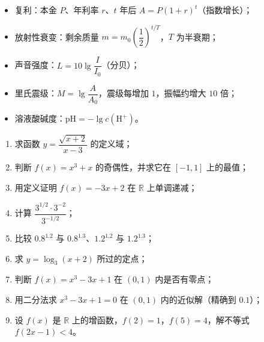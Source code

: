\begin{explore}
\begin{itemize}
  \item 复利：本金 $P$、年利率 $r$、$t$ 年后 $A=P(1+r)^t$（指数增长）；
  \item 放射性衰变：剩余质量 $m=m_0\left(\dfrac12\right)^{t/T}$，$T$ 为半衰期；
  \item 声音强度：$L=10\lg\dfrac{I}{I_0}$（分贝）；
  \item 里氏震级：$M=\lg\dfrac{A}{A_0}$，震级每增加 $1$，振幅约增大 $10$ 倍；
  \item 溶液酸碱度：$\mathrm{pH}=-\lg c(\mathrm{H}^+)$。
\end{itemize}

\end{explore}

\begin{inclasstest}
\begin{enumerate}
  \item 求函数 $y=\dfrac{\sqrt{x+2}}{x-3}$ 的定义域；
  \item 判断 $f(x)=x^3+x$ 的奇偶性，并求它在 $[-1,1]$ 上的最值；
  \item 用定义证明 $f(x)=-3x+2$ 在 $\mathbb{R}$ 上单调递减；
  \item 计算 $\dfrac{3^{1/2}\cdot3^{-2}}{3^{-1/2}}$；
  \item 比较 $0.8^{1.2}$ 与 $0.8^{1.3}$、$1.2^{1.2}$ 与 $1.2^{1.3}$；
  \item 求 $y=\log_3(x+2)$ 所过的定点；
  \item 判断 $f(x)=x^3-3x+1$ 在 $(0,1)$ 内是否有零点；
  \item 用二分法求 $x^3-3x+1=0$ 在 $(0,1)$ 内的近似解（精确到 $0.1$）；
  \item 设 $f(x)$ 是 $\mathbb{R}$ 上的增函数，$f(2)=1$，$f(5)=4$，解不等式 $f(2x-1)<4$。
\end{enumerate}
\end{inclasstest}

